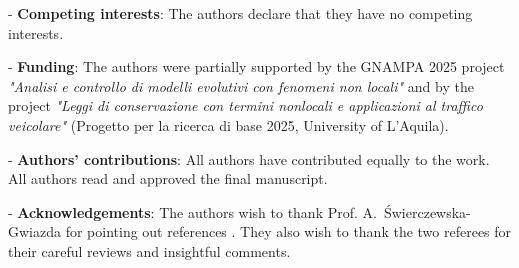 \documentclass[11pt,a4paper,oneside]{amsart}
\begin{document}
- {\bf Competing interests}: The authors declare that they have no competing interests.

- {\bf Funding}: The authors were partially supported by the GNAMPA 2025 project \emph{"Analisi e controllo di modelli evolutivi con fenomeni non locali"} and by the project \emph{"Leggi di conservazione con termini nonlocali e applicazioni al traffico veicolare"} 
(Progetto per la ricerca di base 2025, University of L'Aquila).

- {\bf Authors' contributions}: All authors have contributed equally to the work. All authors read and approved the final manuscript.

- {\bf Acknowledgements}: %
{The authors wish to thank Prof. A.~\'{S}wierczewska-Gwiazda for pointing out references \cite{CPSZ2024,WZ2025}. They also wish to thank the two referees for their careful reviews and insightful comments.}
\end{document}
